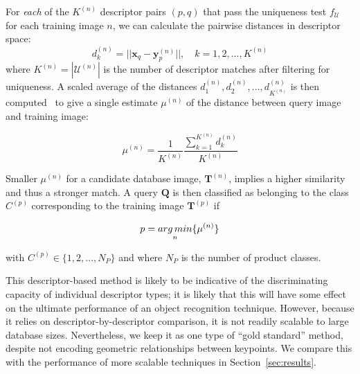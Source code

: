 For {\em each} of the $K^{(n)}$ descriptor pairs $(p,q)$ that pass the uniqueness test $f_{\mathcal{U}}$ for each training image $n$, we can calculate the pairwise distances in descriptor space:
\begin{equation}
d_k^{(n)} =  ||\mathbf{x}_q-\mathbf{y}_p^{(n)}||, \quad k = 1,2,...,K^{(n)}
\label{EucDistance}
\end{equation}
where $K^{(n)} = |\mathcal{U}^{(n)}|$ is the number of descriptor matches after filtering for uniqueness. A scaled average of the distances $d_1^{(n)},d_2^{(n)},...,d_{K^{(n)}}^{(n)}$ is then computed~\cite{Li2009} to give a single estimate $\mu^{(n)}$ of the distance between query image and training image:

\begin{equation}
\mu^{(n)} = \frac{1}{K^{(n)}}\frac{\sum_{k=1}^{K^{(n)}} d_k^{(n)}}{K^{(n)}}
\label{eqScore}
\end{equation}

Smaller $\mu^{(n)}$ for a candidate database image, $\mathbf{T}^{(n)}$, implies a higher similarity and thus a stronger match.
A query $\textbf{Q}$ is then classified as belonging to the class $C^{(p)}$ corresponding to the training image $\mathbf{T}^{(p)}$ if

\begin{equation}
p = \underset{n}{arg\,min}\lbrace \mu^{(n)}\rbrace
\end{equation}

\noindent with $C^{(p)} \in \lbrace 1, 2,..., N_P\rbrace $ and where $N_P$ is the number of product classes.

This descriptor-based method is likely to be indicative of the discriminating capacity of individual descriptor types; it is likely that this will have some effect on the ultimate performance of an object recognition technique. However, because it relies on descriptor-by-descriptor comparison, it is not readily scalable to large database sizes. Nevertheless, we keep it as one type of ``gold standard'' method, despite not encoding geometric relationships between keypoints. We compare this with the performance of more scalable techniques in Section~\ref{sec:results}.



